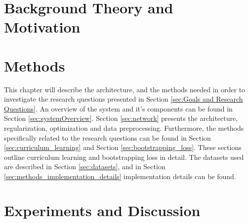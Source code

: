 \documentclass[a4paper]{book}
\begin{document}












\chapter{Background Theory and Motivation}\label{T-B}
\label{cha:TheoryAndBackground}











\chapter{Methods}
\label{cha:architectureAndModel}
This chapter will describe the architecture, and the methods needed in order to investigate the research questions presented in Section \ref{sec:Goals and Research Questions}. An overview of the system and it's components can be found in Section \ref{sec:systemOverview}. Section \ref{sec:network} presents the architecture, regularization, optimization and data preprocessing. Furthermore, the methods specifically related to the research questions can be found in Section \ref{sec:curriculum_learning} and Section \ref{sec:bootstrapping_loss}. These sections outline curriculum learning and bootstrapping loss in detail. The datasets used are described in Section \ref{sec:datasets}, and in Section \ref{sec:methods_implementation_details} implementation details can be found.














\chapter{Experiments and Discussion}
\end{document}
